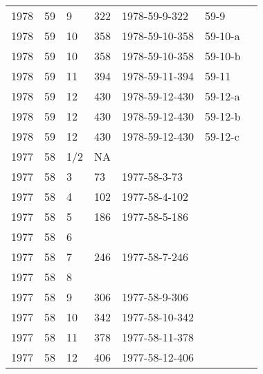 \begin{longtable}{ |l|l|l|l|p{2.7cm}|l|p{2cm}| }
 1978 & 59 &     9 &     322 & 1978-59-9-322  & 59-9  & \\
 1978 & 59 &    10 &     358 & 1978-59-10-358 & 59-10-a & \\
 1978 & 59 &    10 &     358 & 1978-59-10-358 & 59-10-b & \\
 1978 & 59 &    11 &     394 & 1978-59-11-394 & 59-11 & \\
 1978 & 59 &    12 &     430 & 1978-59-12-430 & 59-12-a & \\
 1978 & 59 &    12 &     430 & 1978-59-12-430 & 59-12-b & \\
 1978 & 59 &    12 &     430 & 1978-59-12-430 & 59-12-c & \\
 1977 & 58 &   1/2 &      NA &                &  &  \\
 1977 & 58 &     3 &      73 & 1977-58-3-73   &  & \\
 1977 & 58 &     4 &     102 & 1977-58-4-102  &  & \\
 1977 & 58 &     5 &     186 & 1977-58-5-186  &  & \\
 1977 & 58 &     6 &         &                &  & \\
 1977 & 58 &     7 &     246 & 1977-58-7-246  &  & \\
 1977 & 58 &     8 &         &                &  & \\
 1977 & 58 &     9 &     306 & 1977-58-9-306  &  & \\
 1977 & 58 &    10 & 342     & 1977-58-10-342 &  & \\
 1977 & 58 &    11 &   378   & 1977-58-11-378 &  & \\
 1977 & 58 &    12 &    406  & 1977-58-12-406 &  & \\
\end{longtable}

